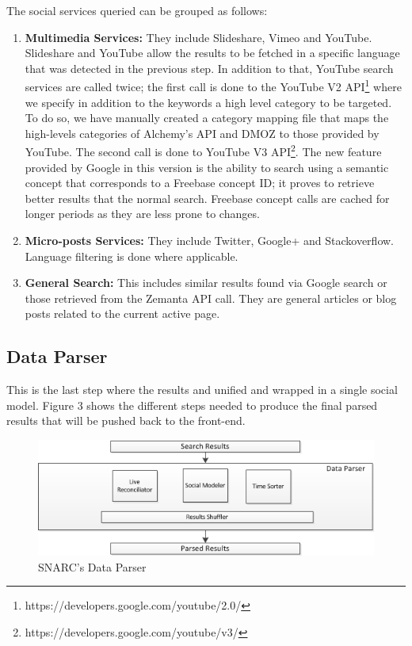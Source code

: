 \documentclass[oribibl]{llncs}
\begin{document}
The social services queried can be grouped as follows:
\begin{enumerate}
\item {\bf Multimedia Services:} They include Slideshare, Vimeo and YouTube. Slideshare and YouTube allow the results to be fetched in a specific language that was detected in the previous step. In addition to that, YouTube search services are called twice; the first call is done to the YouTube V2 API\footnote{https://developers.google.com/youtube/2.0/} where we specify in addition to the keywords a high level category to be targeted. To do so, we have manually created a category mapping file that maps the high-levels categories of Alchemy’s API and DMOZ to those provided by YouTube. The second call is done to YouTube V3 API\footnote{https://developers.google.com/youtube/v3/}. The new feature provided by Google in this version is the ability to search using a semantic concept that corresponds to a Freebase concept ID; it proves to retrieve better results that the normal search. Freebase concept calls are cached for longer periods as they are less prone to changes. 
\item {\bf Micro-posts Services:} They include Twitter, Google+ and Stackoverflow. Language filtering is done where applicable. 
\item {\bf General Search:} This includes similar results found via Google search or those retrieved from the Zemanta API call. They are general articles or blog posts related to the current active page.
\end{enumerate}
\subsection{Data Parser}
This is the last step where the results and unified and wrapped in a single social model. Figure 3 shows the different steps needed to produce the final parsed results that will be pushed back to the front-end.
\begin{figure}[h!]
  \centering
    \includegraphics[scale=0.8]{architecture-part3.png} 
  \caption{SNARC's Data Parser}
\end{figure}
\end{document}
